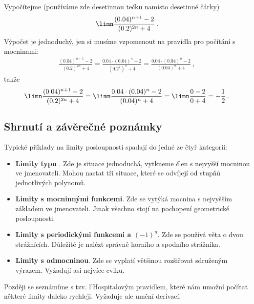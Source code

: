 \begin{example}
    Vypočítejme (používáme zde desetinnou tečku namísto desetinné čárky)
    \begin{align}
        \limn \frac{(0.04)^{n+1}-2}{(0.2)^{2n}+4} \:.
    \end{align}
    Výpočet je jednoduchý, jen si musíme vzpomenout na pravidla pro počítání s mocninami:
    \begin{align}
        \frac{(0.04)^{n+1}-2}{(0.2)^{2n}+4} =
        \frac{0.04 \cdot (0.04)^{n} - 2}{(0.2^2)^n + 4} =
        \frac{0.04 \cdot (0.04)^{n} - 2}{(0.04)^n + 4} \:,
    \end{align}
    takže
    \begin{align}
        \limn \frac{(0.04)^{n+1}-2}{(0.2)^{2n}+4}
        =
        \limn \frac{0.04 \cdot (0.04)^{n} - 2}{(0.04)^n + 4}
        =
        \limn \frac{0 - 2}{0 +4} = - \frac{1}{2} \:.
    \end{align}
\end{example}

\subsection*{Shrnutí a závěrečné poznámky}
Typické příklady na limity posloupností spadají do jedné ze čtyř kategorií:
\begin{itemize}
    \item \textbf{Limity typu }. Zde je situace jednoduchá, vytkneme člen s nejvyšší mocninou ve jmenovateli. Mohou nastat tři situace, které se odvíjejí od stupňů jednotlivých polynomů.
    \item \textbf{Limity s mocninnými funkcemi}. Zde se vytýká mocnina s nejvyšším základem ve jmenovateli. Jinak všechno stojí na pochopení geometrické posloupnosti.
    \item \textbf{Limity s periodickými funkcemi a $(-1)^n$}. Zde se používá věta o dvou strážnících. Důležité je nalézt správně horního a spodního strážníka.
    \item \textbf{Limity s odmocninou}. Zde se vyplatí většinou rozšiřovat sdruženým výrazem. Vyžadují asi nejvíce cviku.
\end{itemize}

Později se seznámíme s tzv. l'Hospitalovým pravidlem, které nám umožní počítat některé limity daleko rychleji. Vyžaduje ale umění derivací. 